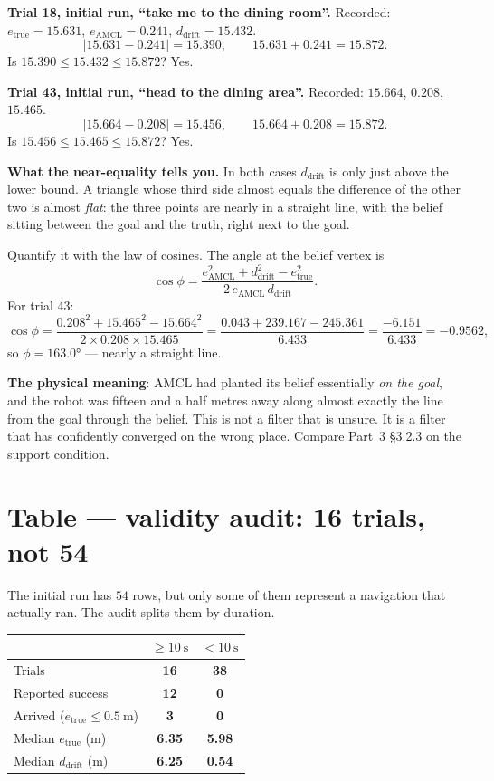 \documentclass[11pt,a4paper]{report}
\begin{document}
\begin{handbox}
\textbf{Trial 18, initial run, ``take me to the dining room''.}
Recorded: $e_{\text{true}} = 15.631$, $e_{\text{AMCL}} = 0.241$,
$d_{\text{drift}} = 15.432$.
\[
\bigl|15.631 - 0.241\bigr| = 15.390,
\qquad 15.631 + 0.241 = 15.872 .
\]
Is $15.390 \le 15.432 \le 15.872$? Yes. \checkmark

\smallskip
\textbf{Trial 43, initial run, ``head to the dining area''.}
Recorded: $15.664$, $0.208$, $15.465$.
\[
\bigl|15.664 - 0.208\bigr| = 15.456,
\qquad 15.664 + 0.208 = 15.872 .
\]
Is $15.456 \le 15.465 \le 15.872$? Yes. \checkmark

\smallskip
\textbf{What the near-equality tells you.} In both cases $d_{\text{drift}}$ is
only just above the lower bound. A triangle whose third side almost equals the
difference of the other two is almost \emph{flat}: the three points are nearly
in a straight line, with the belief sitting between the goal and the truth,
right next to the goal.

Quantify it with the law of cosines. The angle at the belief vertex is
\[
\cos\phi = \frac{e_{\text{AMCL}}^2 + d_{\text{drift}}^2 - e_{\text{true}}^2}
                {2\, e_{\text{AMCL}}\, d_{\text{drift}}} .
\]
For trial 43:
\[
\cos\phi = \frac{0.208^2 + 15.465^2 - 15.664^2}{2 \times 0.208 \times 15.465}
= \frac{0.043 + 239.167 - 245.361}{6.433}
= \frac{-6.151}{6.433} = -0.9562,
\]
so $\phi = \ang{163.0}$ --- nearly a straight line.

\textbf{The physical meaning}: AMCL had planted its belief essentially
\emph{on the goal}, and the robot was fifteen and a half metres away along
almost exactly the line from the goal through the belief. This is not a filter
that is unsure. It is a filter that has confidently converged on the wrong
place. Compare Part~3 \S3.2.3 on the support condition.
\end{handbox}

\section{Table --- validity audit: 16 trials, not 54}
\label{sec:hand-audit}

The initial run has $54$ rows, but only some of them represent a navigation
that actually ran. The audit splits them by duration.

\begin{center}
\begin{tabular}{@{}lcc@{}}
\toprule
 & $\ge \SI{10}{\second}$ & $< \SI{10}{\second}$ \\
\midrule
Trials & \textbf{16} & \textbf{38} \\
Reported success & \textbf{12} & \textbf{0} \\
Arrived ($e_{\text{true}} \le \SI{0.5}{\metre}$) & \textbf{3} & \textbf{0} \\
Median $e_{\text{true}}$ (\si{\metre}) & \textbf{6.35} & \textbf{5.98} \\
Median $d_{\text{drift}}$ (\si{\metre}) & \textbf{6.25} & \textbf{0.54} \\
\bottomrule
\end{tabular}
\end{center}
\end{document}
